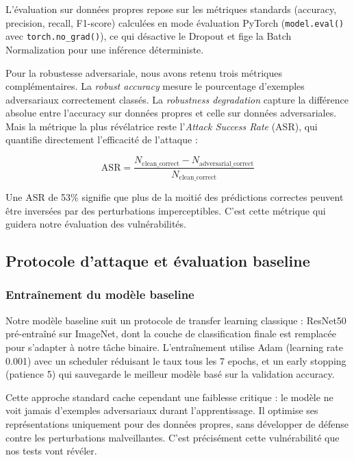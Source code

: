 L'évaluation sur données propres repose sur les métriques standards (accuracy, precision, recall, F1-score) calculées en mode évaluation PyTorch (\texttt{model.eval()} avec \texttt{torch.no\_grad()}), ce qui désactive le Dropout et fige la Batch Normalization pour une inférence déterministe.

Pour la robustesse adversariale, nous avons retenu trois métriques complémentaires. La \textit{robust accuracy} mesure le pourcentage d'exemples adversariaux correctement classés. La \textit{robustness degradation} capture la différence absolue entre l'accuracy sur données propres et celle sur données adversariales. Mais la métrique la plus révélatrice reste l'\textit{Attack Success Rate} (ASR), qui quantifie directement l'efficacité de l'attaque :

\begin{equation}
\text{ASR} = \frac{N_{\text{clean\_correct}} - N_{\text{adversarial\_correct}}}{N_{\text{clean\_correct}}}
\label{eq:asr_simple}
\end{equation}

Une ASR de 53\% signifie que plus de la moitié des prédictions correctes peuvent être inversées par des perturbations imperceptibles. C'est cette métrique qui guidera notre évaluation des vulnérabilités.

\subsection{Protocole d'attaque et évaluation baseline}

\subsubsection{Entraînement du modèle baseline}

Notre modèle baseline suit un protocole de transfer learning classique : ResNet50 pré-entraîné sur ImageNet, dont la couche de classification finale est remplacée pour s'adapter à notre tâche binaire. L'entraînement utilise Adam (learning rate 0.001) avec un scheduler réduisant le taux tous les 7 epochs, et un early stopping (patience 5) qui sauvegarde le meilleur modèle basé sur la validation accuracy.

Cette approche standard cache cependant une faiblesse critique : le modèle ne voit jamais d'exemples adversariaux durant l'apprentissage. Il optimise ses représentations uniquement pour des données propres, sans développer de défense contre les perturbations malveillantes. C'est précisément cette vulnérabilité que nos tests vont révéler.

